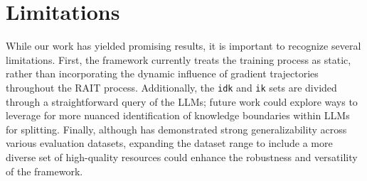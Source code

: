 \section*{Limitations}
\label{latex/limitation}
While our work has yielded promising results, it is important to recognize several limitations. First, the \M framework currently treats the training process as static, rather than incorporating the dynamic influence of gradient trajectories throughout the RAIT process. Additionally, the \texttt{idk} and \texttt{ik} sets are divided through a straightforward query of the LLMs; future work could explore ways to leverage \M for more nuanced identification of knowledge boundaries within LLMs for splitting. Finally, although \M has demonstrated strong generalizability across various evaluation datasets, expanding the dataset range to include a more diverse set of high-quality resources could enhance the robustness and versatility of the framework.


